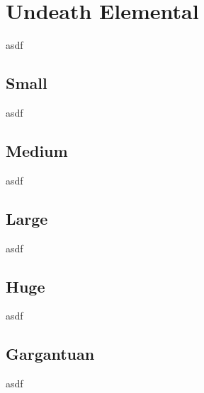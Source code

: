 \section{Undeath Elemental}

asdf

\subsection{Small}

asdf

\subsection{Medium}

asdf

\subsection{Large}

asdf

\subsection{Huge}

asdf

\subsection{Gargantuan}

asdf
